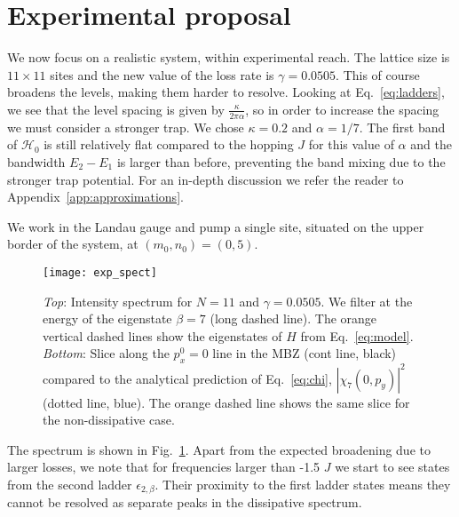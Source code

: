 \documentclass[twocolumn, 10pt, aps, superscriptaddress, floatfix, showpacs, pra, citeautoscript]{revtex4-1}
\newcommand{\co}[2]{#2}
\renewcommand{\paragraph}{\co}
\begin{document}

\section{Experimental proposal}
\label{sec:experiment}

\paragraph{Greater dissipation implies spectral broadening.}
We now focus on a realistic system, within experimental reach. The
lattice size is $11 \times 11$ sites and the new value of the loss
rate is $\gamma = 0.0505$. This of course broadens the levels, making
them harder to resolve. Looking at Eq.~\eqref{eq:ladders}, we see that
the level spacing is given by $\frac{\kappa}{2\pi\alpha}$, so in order
to increase the spacing we must consider a stronger trap. We chose
$\kappa = 0.2$ and $\alpha = 1/7$. The first band of $\mathcal{H}_0$
is still relatively flat compared to the hopping $J$ for this value of
$\alpha$ and the bandwidth $E_2 - E_1$ is larger than before,
preventing the band mixing due to the stronger trap potential. For an
in-depth discussion we refer the reader to
Appendix~\ref{app:approximations}.

 We work in the Landau gauge and pump a single site,
situated on the upper border of the system, at $(m_0,n_0)= (0,5)$.

\begin{figure}[htb]
  \centering
  \texttt{[image: exp\_spect]}
  \caption{\emph{Top}: Intensity spectrum for $N=11$ and
    $\gamma = 0.0505$. We filter at the energy of the eigenstate
    $\beta=7$ (long dashed line). The orange vertical dashed lines
    show the eigenstates of $H$ from Eq.~\eqref{eq:model}.
    \emph{Bottom}: Slice along the $p_x^0 = 0$ line in the MBZ (cont
    line, black) compared to the analytical prediction of
    Eq.~\eqref{eq:chi}, $|\chi_7(0,p_y)|^2$ (dotted line, blue). The
    orange dashed line shows the same slice for the non-dissipative
    case.}
  \label{fig:exp_spectrum}
\end{figure}


The spectrum is shown in Fig.~\ref{fig:exp_spectrum}. Apart from the
expected broadening due to larger losses, we note that for frequencies
larger than -1.5 $J$ we start to see states from the second ladder
$\epsilon_{2,\beta}$. Their proximity to the first ladder states means
they cannot be resolved as separate peaks in the dissipative spectrum.
\end{document}
